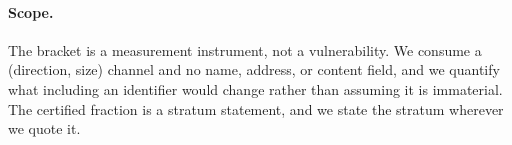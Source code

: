 \paragraph{Scope.}
The bracket is a measurement instrument, not a vulnerability. We consume a
(direction, size) channel and no name, address, or content field, and we quantify
what including an identifier would change rather than assuming it is immaterial.
The certified fraction is a stratum statement, and we state the stratum wherever
we quote it.

